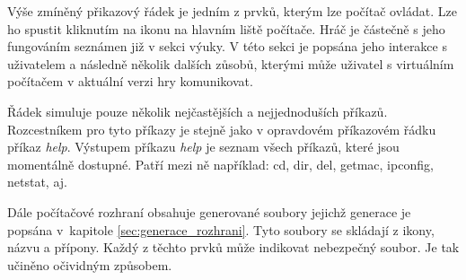 \label{sec:o_prikazovem_radku}

Výše zmíněný přikazový řádek je jedním z prvků, kterým lze počítač ovládat. Lze ho spustit kliknutím na ikonu na hlavním liště počítače. Hráč je částečně s jeho fungováním seznámen již v sekci výuky. V této sekci je popsána jeho interakce s uživatelem a následně několik dalších zůsobů, kterými může uživatel s virtuálním počítačem v aktuální verzi hry komunikovat.

Řádek simuluje pouze několik nejčastějších a nejjednoduších příkazů. Rozcestníkem pro tyto příkazy je stejně jako v opravdovém příkazovém řádku příkaz \textit{help}. Výstupem příkazu \textit{help} je seznam všech příkazů, které jsou momentálně dostupné. Patří mezi ně například: cd, dir, del, getmac, ipconfig, netstat, aj.

Dále počítačové rozhraní obsahuje generované soubory jejichž generace je popsána v~kapitole \ref{sec:generace_rozhrani}. Tyto soubory se skládají z ikony, názvu a přípony. Každý z těchto prvků může indikovat nebezpečný soubor. Je tak učiněno očividným způsobem.